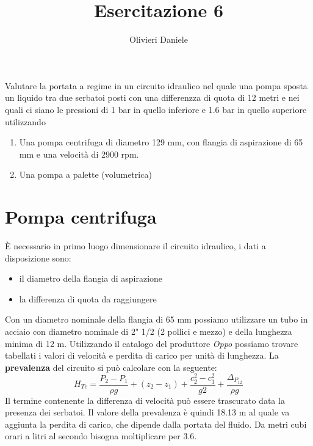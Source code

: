 \documentclass[a4paper,12pt]{article}
\title{Esercitazione 6}
\author{Olivieri Daniele}
\date{}
\begin{document}
\maketitle
Valutare la portata a regime in un circuito idraulico nel quale una pompa sposta un liquido tra due serbatoi posti con una differenzza di quota
di 12 metri e nei quali ci siano le pressioni di 1 bar in quello inferiore e 1.6 bar in quello superiore utilizzando
\begin{enumerate}
    \item Una pompa centrifuga di diametro 129 mm, con flangia di aspirazione di 65 mm e una velocità di 2900 rpm.
    \item Una pompa a palette (volumetrica)
\end{enumerate}

\section{Pompa centrifuga}
È necessario in primo luogo dimensionare il circuito idraulico, i dati a disposizione sono:
\begin{itemize}
    \item il diametro della flangia di aspirazione
    \item la differenza di quota da raggiungere
\end{itemize}
Con un diametro nominale della flangia di 65 mm possiamo utilizzare un tubo in acciaio con diametro nominale di 2" 1/2 (2 pollici e mezzo) e della lunghezza minima di 12 m.
Utilizzando il catalogo del produttore \textit{Oppo} possiamo trovare tabellati i valori di velocità e perdita di carico per unità di lunghezza.
La \textbf{prevalenza} del circuito si può calcolare con la seguente:
\begin{equation}
    H_{Tc} = \frac{P_2-P_1}{\rho g} + (z_2-z_1) + \frac{c_2^2-c_1^2}{g2} + \frac{\Delta_{P_{12}}}{\rho g}
\end{equation}
Il termine contenente la differenza di velocità può essere trascurato data la presenza dei serbatoi.
Il valore della prevalenza è quindi 18.13 m al quale va aggiunta la perdita di carico, che dipende dalla portata del fluido.
Da metri cubi orari a litri al secondo bisogna moltiplicare per 3.6.
\end{document}
